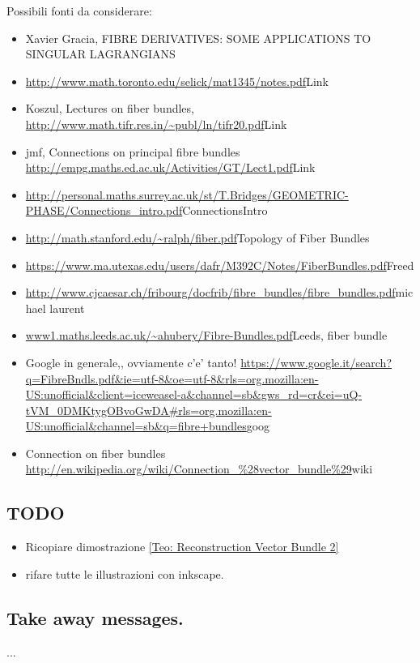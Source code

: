 \documentclass[a4paper,12pt]{scrartcl}    %
\begin{document}
\vspace{8mm}
Possibili fonti da considerare:
\begin{itemize}
	\item Xavier Gracia, FIBRE DERIVATIVES: SOME APPLICATIONS TO SINGULAR LAGRANGIANS 
	\item \url{http://www.math.toronto.edu/selick/mat1345/notes.pdf}{Link}
	\item Koszul, Lectures on fiber bundles, \url{http://www.math.tifr.res.in/~publ/ln/tifr20.pdf}{Link}
	\item jmf, Connections on principal fibre bundles \url{http://empg.maths.ed.ac.uk/Activities/GT/Lect1.pdf}{Link}
	\item \url{http://personal.maths.surrey.ac.uk/st/T.Bridges/GEOMETRIC-PHASE/Connections_intro.pdf}{ConnectionsIntro}
	\item \url{http://math.stanford.edu/~ralph/fiber.pdf}{Topology of Fiber Bundles}
	\item \url{https://www.ma.utexas.edu/users/dafr/M392C/Notes/FiberBundles.pdf}{Freed}
	\item \url{http://www.cjcaesar.ch/fribourg/docfrib/fibre_bundles/fibre_bundles.pdf}{michael laurent}
	\item \url{www1.maths.leeds.ac.uk/~ahubery/Fibre-Bundles.pdf}{Leeds, fiber bundle}
	\item Google in generale,, ovviamente c'e' tanto! \url{https://www.google.it/search?q=FibreBndls.pdf&ie=utf-8&oe=utf-8&rls=org.mozilla:en-US:unofficial&client=iceweasel-a&channel=sb&gws_rd=cr&ei=uQ-tVM_0DMKtygOBvoGwDA#rls=org.mozilla:en-US:unofficial&channel=sb&q=fibre+bundles}{goog}	
	\item Connection on fiber bundles \url{http://en.wikipedia.org/wiki/Connection_%28vector_bundle%29}{wiki}	
	
\end{itemize}

\subsection{TODO}
\begin{itemize}
\item Ricopiare dimostrazione \ref{Teo: Reconstruction Vector Bundle 2}

\item rifare tutte le illustrazioni con inkscape.
\end{itemize}

\subsection{Take away messages.}
	...
\end{document}
